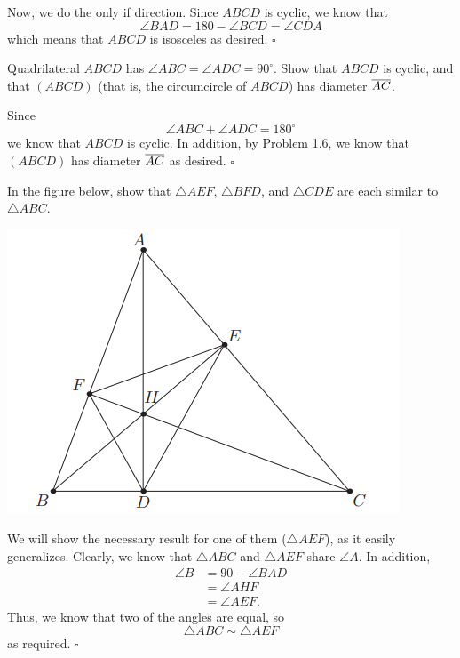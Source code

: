 \documentclass{article}
\begin{document}
Now, we do the only if direction. Since $ABCD$ is cyclic, we know that \[\angle BAD = 180-\angle BCD = \angle CDA\] which means that $ABCD$ is isosceles as desired. $\square$

\begin{problem}[1.11]{}
Quadrilateral $ABCD$ has $\angle ABC = \angle ADC = 90^\circ$. Show that $ABCD$ is cyclic, and that $(ABCD)$ (that is, the circumcircle of $ABCD$) has diameter $\overline{AC}$.
\end{problem}
Since \[\angle ABC + \angle ADC = 180^\circ\] we know that $ABCD$ is cyclic. In addition, by Problem 1.6, we know that $(ABCD)$ has diameter $\overline{AC}$ as desired. $\square$

\begin{problem}[1.16]{}
In the figure below, show that $\triangle AEF$, $\triangle BFD$, and $\triangle CDE$ are each similar to $\triangle ABC$.

\begin{center}
\includegraphics[width=0.5\linewidth]{Figure 1.3A.png}
\end{center}
\end{problem}
We will show the necessary result for one of them ($\triangle AEF$), as it easily generalizes. Clearly, we know that $\triangle ABC$ and $\triangle AEF$ share $\angle A$. In addition, 
\begin{align*}
\angle B &= 90-\angle BAD \\
&= \angle AHF \\
&= \angle AEF.
\end{align*}
Thus, we know that two of the angles are equal, so \[\triangle ABC \sim \triangle AEF\] as required. $\square$
\end{document}
